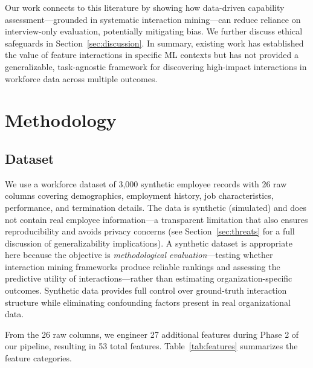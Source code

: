 \documentclass[conference]{IEEEtran}
\begin{document}
Our work connects to this literature by showing how data-driven capability assessment---grounded in systematic interaction mining---can reduce reliance on interview-only evaluation, potentially mitigating bias. We further discuss ethical safeguards in Section~\ref{sec:discussion}. In summary, existing work has established the value of feature interactions in specific ML contexts but has not provided a generalizable, task-agnostic framework for discovering high-impact interactions in workforce data across multiple outcomes.

\section{Methodology}
\label{sec:methodology}

\subsection{Dataset}

We use a workforce dataset of 3,000 synthetic employee records with 26 raw columns covering demographics, employment history, job characteristics, performance, and termination details. The data is synthetic (simulated) and does not contain real employee information---a transparent limitation that also ensures reproducibility and avoids privacy concerns (see Section~\ref{sec:threats} for a full discussion of generalizability implications). A synthetic dataset is appropriate here because the objective is \textit{methodological evaluation}---testing whether interaction mining frameworks produce reliable rankings and assessing the predictive utility of interactions---rather than estimating organization-specific outcomes. Synthetic data provides full control over ground-truth interaction structure while eliminating confounding factors present in real organizational data.

From the 26 raw columns, we engineer 27 additional features during Phase 2 of our pipeline, resulting in 53 total features. Table~\ref{tab:features} summarizes the feature categories.
\end{document}
